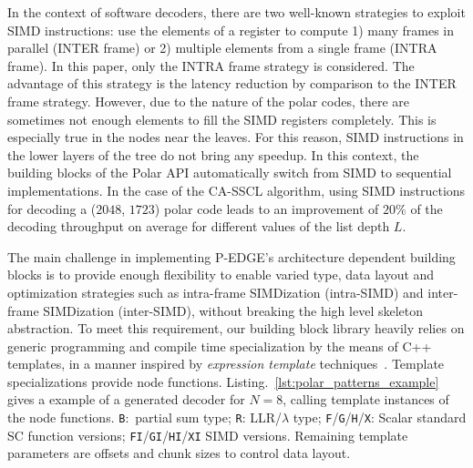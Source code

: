 In the context of software decoders, there are two well-known strategies to
exploit SIMD instructions: use the elements of a register to compute 1) many
frames in parallel (INTER frame) or 2) multiple elements from a single frame
(INTRA frame). In this paper, only the INTRA frame strategy is considered. The
advantage of this strategy is the latency reduction by comparison to the INTER
frame strategy. However, due to the nature of the polar codes, there are
sometimes not enough elements to fill the SIMD registers completely. This is
especially true in the nodes near the leaves. For this reason, SIMD instructions
in the lower layers of the tree do not bring any speedup. In this context, the
building blocks of the Polar API automatically switch from SIMD to sequential
implementations. In the case of the CA-SSCL algorithm, using SIMD instructions
for decoding a ($2048$, $1723$) polar code leads to an improvement of $20\%$ of
the decoding throughput on average for different values of the list depth $L$.


The main challenge in implementing P-EDGE's architecture dependent building
blocks is to provide enough flexibility to enable varied type, data layout and
optimization strategies such as intra-frame SIMDization (intra-SIMD) and
inter-frame SIMDization (inter-SIMD), without breaking the high level skeleton
abstraction. To meet this requirement, our building block library heavily relies
on generic programming and compile time specialization by the means of C++
templates, in a manner inspired by \emph{expression template}
techniques~\cite{Stroustrup2013}. Template specializations provide node
functions. Listing.~\ref{lst:polar_patterns_example} gives a example of a
generated decoder for $N = 8$, calling template instances of the node functions.
\verb|B|:~partial sum type; \verb|R|: LLR/$\lambda$ type;
\verb|F|/\verb|G|/\verb|H|/\verb|X|: Scalar standard SC function versions;
\verb|FI|/\verb|GI|/\verb|HI|/\verb|XI| SIMD versions. Remaining template
parameters are offsets and chunk sizes to control data layout.

